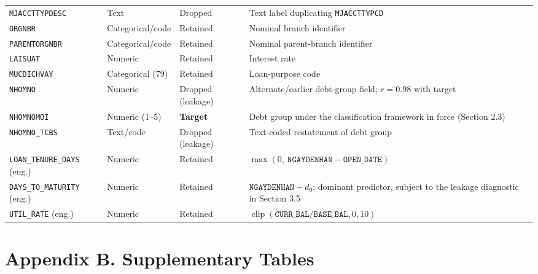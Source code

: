 \documentclass[11pt,a4paper]{article}
\begin{document}
\begin{table}[H]
\begin{tabular}{p{2.9cm}p{2.1cm}p{2.3cm}p{6.0cm}}
\texttt{MJACCTTYPDESC} & Text & Dropped & Text label duplicating \texttt{MJACCTTYPCD} \\
\texttt{ORGNBR} & Categorical/code & Retained & Nominal branch identifier \\
\texttt{PARENTORGNBR} & Categorical/code & Retained & Nominal parent-branch identifier \\
\texttt{LAISUAT} & Numeric & Retained & Interest rate \\
\texttt{MUCDICHVAY} & Categorical (79) & Retained & Loan-purpose code \\
\texttt{NHOMNO} & Numeric & Dropped (leakage) & Alternate/earlier debt-group field; $r=0.98$ with target \\
\texttt{NHOMNOMOI} & Numeric (1--5) & \textbf{Target} & Debt group under the classification framework in force (Section 2.3) \\
\texttt{NHOMNO\_TCBS} & Text/code & Dropped (leakage) & Text-coded restatement of debt group \\
\texttt{LOAN\_TENURE\_DAYS} (eng.) & Numeric & Retained & $\max(0,\ \texttt{NGAYDENHAN} - \texttt{OPEN\_DATE})$ \\
\texttt{DAYS\_TO\_MATURITY} (eng.) & Numeric & Retained & $\texttt{NGAYDENHAN} - d_0$; dominant predictor, subject to the leakage diagnostic in Section 3.5 \\
\texttt{UTIL\_RATE} (eng.) & Numeric & Retained & $\operatorname{clip}(\texttt{CURR\_BAL}/\texttt{BASE\_BAL},0,10)$ \\
\bottomrule
\end{tabular}
\end{table}


\section*{Appendix B. Supplementary Tables}
\end{document}
